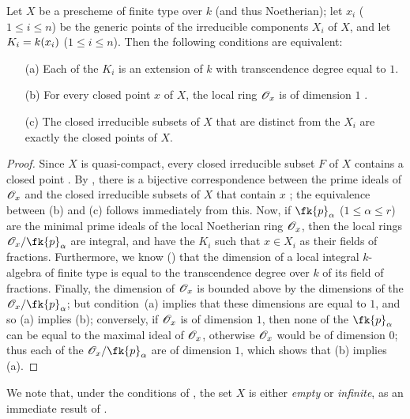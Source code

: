 \begin{proposition}
\label{II.7.4.1}
Let $X$ be a prescheme of finite type over $k$ (and thus Noetherian);
let $x_i$ ($1\leq i\leq n$) be the generic points of the irreducible components $X_i$ of $X$, and let $K_i=k(x_i)$ ($1\leq i\leq n$).
Then the following conditions are equivalent:
\begin{enumerate}
    \item[\rm{(a)}] Each of the $K_i$ is an extension of $k$ with transcendence degree equal to $1$.
    \item[\rm{(b)}] For every closed point $x$ of $X$, the local ring $\mathscr{O}_x$ is of dimension $1$ .
    \item[\rm{(c)}] The closed irreducible subsets of $X$ that are distinct from the $X_i$ are exactly the closed points of $X$.
\end{enumerate}
\end{proposition}

\begin{proof}
\label{proof-II.7.4.1}
Since $X$ is quasi-compact, every closed irreducible subset $F$ of $X$ contains a closed point .
By , there is a bijective correspondence between the prime ideals of $\mathscr{O}_x$ and the closed irreducible subsets of $X$ that contain $x$ ;
the equivalence between (b) and (c) follows immediately from this.
Now, if $\fk{p}_\alpha$ ($1\leq\alpha\leq r$) are the minimal prime ideals of the local Noetherian ring $\mathscr{O}_x$, then the local rings $\sh{O}_x/\fk{p}_\alpha$ are integral, and have the $K_i$ such that $x\in X_i$ as their fields of fractions.
Furthermore, we know (\cite[p.~4-06, th.~2]{I-1}) that the dimension of a local integral $k$-algebra of finite type is equal to the transcendence degree over $k$ of its field of fractions.
Finally, the dimension of $\mathscr{O}_x$ is bounded above by the dimensions of the $\sh{O}_x/\fk{p}_\alpha$;
but condition~(a) implies that these dimensions are equal to $1$, and so (a) implies (b);
conversely, if $\mathscr{O}_x$ is of dimension $1$, then none of the $\fk{p}_\alpha$ can be equal to the maximal ideal of $\mathscr{O}_x$, otherwise $\mathscr{O}_x$ would be of dimension $0$;
thus each of the $\sh{O}_x/\fk{p}_\alpha$ are of dimension $1$, which shows that (b) implies (a).
\end{proof}

We note that, under the conditions of , the set $X$ is either \emph{empty} or \emph{infinite}, as an immediate result of .

